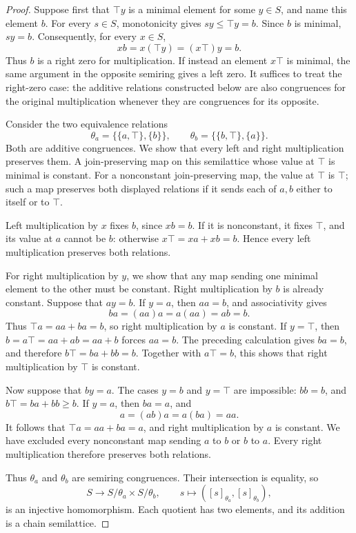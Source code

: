 \documentclass[11pt,reqno]{amsart}
\numberwithin{equation}{section}
\theoremstyle{definition}
\theoremstyle{remark}
\begin{document}
\begin{proof}
Suppose first that $\top y$ is a minimal element for some $y\in S$,
and name this element $b$. For every $s\in S$, monotonicity gives
$sy\leq\top y=b$. Since $b$ is minimal, $sy=b$.
Consequently, for every $x\in S$,
\[
xb=x(\top y)=(x\top)y=b.
\]
Thus $b$ is a right zero for multiplication. If instead an element
$x\top$ is minimal, the same argument in the opposite semiring
gives a left zero. It suffices to treat the right-zero case:
the additive relations constructed below are also congruences for
the original multiplication whenever they are congruences for its
opposite.

Consider the two equivalence relations
\[
\theta_a=\bigl\{\{a,\top\},\{b\}\bigr\},\qquad
\theta_b=\bigl\{\{b,\top\},\{a\}\bigr\}.
\]
Both are additive congruences. We show that every left and right
multiplication preserves them. A join-preserving map on this
semilattice whose value at $\top$ is minimal is constant.
For a nonconstant join-preserving map, the value at $\top$ is
$\top$; such a map preserves both displayed relations if it sends
each of $a,b$ either to itself or to $\top$.

Left multiplication by $x$ fixes $b$, since $xb=b$. If it is
nonconstant, it fixes $\top$, and its value at $a$ cannot be $b$:
otherwise $x\top=xa+xb=b$. Hence every left multiplication
preserves both relations.

For right multiplication by $y$, we show that any map sending
one minimal element to the other must be constant. Right multiplication
by $b$ is already constant. Suppose that $ay=b$. If $y=a$,
then $aa=b$, and associativity gives
\[
ba=(aa)a=a(aa)=ab=b.
\]
Thus $\top a=aa+ba=b$, so right multiplication by $a$ is
constant. If $y=\top$, then
$b=a\top=aa+ab=aa+b$ forces $aa=b$. The preceding calculation
gives $ba=b$, and therefore $b\top=ba+bb=b$. Together with
$a\top=b$, this shows that right multiplication by $\top$
is constant.

Now suppose that $by=a$. The cases $y=b$ and $y=\top$ are
impossible: $bb=b$, and $b\top=ba+bb\geq b$.
If $y=a$, then $ba=a$, and
\[
a=(ab)a=a(ba)=aa.
\]
It follows that
$\top a=aa+ba=a$, and right multiplication by $a$ is constant.
We have excluded every nonconstant map sending $a$ to $b$ or $b$ to $a$.
Every right multiplication therefore preserves both relations.

Thus $\theta_a$ and $\theta_b$ are semiring congruences.
Their intersection is equality, so
\[
S\longrightarrow S/\theta_a\times S/\theta_b,\qquad
s\longmapsto([s]_{\theta_a},[s]_{\theta_b}),
\]
is an injective homomorphism. Each quotient has two elements,
and its addition is a chain semilattice.
\end{proof}
\end{document}
